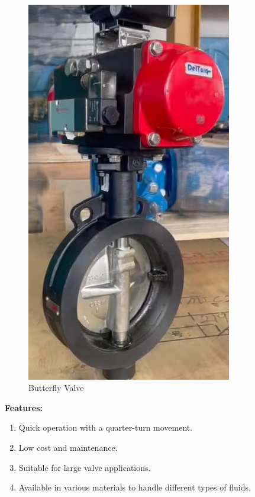 \begin{figure}[h]
    \centering
    \includegraphics[width=0.8\textwidth,height=0.33\textheight,keepaspectratio]{figs/valves/butterfly.png}
    \caption{Butterfly Valve}
    \label{fig:butterfly_valve}
\end{figure}

\textbf{Features:}
\begin{enumerate}
    \item Quick operation with a quarter-turn movement.
    \item Low cost and maintenance.
    \item Suitable for large valve applications.
    \item Available in various materials to handle different types of fluids.
\end{enumerate}

